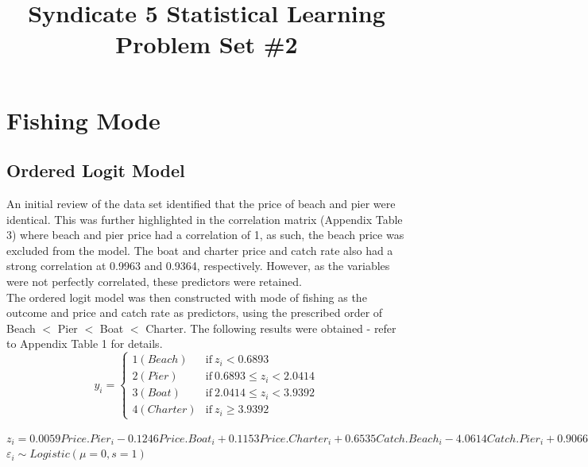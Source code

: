 \documentclass[12pt]{article}
\begin{document}
\title{Syndicate 5 Statistical Learning Problem Set \#2}
\maketitle
{\setlength{\parindent}{0cm}

\section*{Fishing Mode}
\subsection*{Ordered Logit Model}
An initial review of the data set identified that the price of beach and pier were identical. This was further highlighted in the correlation matrix (Appendix Table 3) where beach and pier price had a correlation of 1, as such, the beach price was excluded from the model. The boat and charter price and catch rate also had a strong correlation at 0.9963 and 0.9364, respectively. However, as the variables were not perfectly correlated, these predictors were retained.\\


The ordered logit model was then constructed with mode of fishing as the outcome and price and catch rate as predictors, using the prescribed order of Beach $<$ Pier $<$ Boat $<$ Charter. The following results were obtained - refer to Appendix Table 1 for details.\\

$$y_i = \begin{cases}
1(Beach) & \text{if} \: z_i < 0.6893\\
2(Pier) & \text{if} \: 0.6893 \leq z_i < 2.0414\\
3(Boat) & \text{if} \: 2.0414 \leq z_i < 3.9392\\
4(Charter) & \text{if} \: z_i \geq 3.9392
\end{cases}$$

$z_i = 0.0059Price.Pier_i - 0.1246Price.Boat_i + 0.1153Price.Charter_i + 0.6535Catch.Beach_i - 4.0614Catch.Pier_i + 0.9066Catch.Boat_i + 0.1986Catch.Charter_i + \varepsilon_i$\\
$\varepsilon_i \sim Logistic(\mu = 0, s = 1)$\\

}
\end{document}
